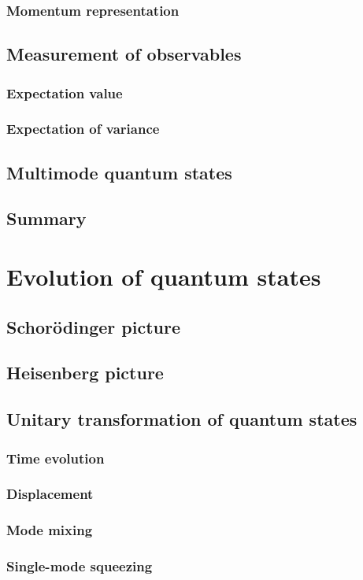 \documentclass{book}
\begin{document}
\subsection{Momentum representation}
\section{Measurement of observables}
\subsection{Expectation value}
\subsection{Expectation of variance}
\section{Multimode quantum states}
\section{Summary}

\chapter{Evolution of quantum states}
\section{Schor\"odinger picture}
\section{Heisenberg picture}
\section{Unitary transformation of quantum states}
\subsection{Time evolution}
\subsection{Displacement}
\subsection{Mode mixing}
\subsection{Single-mode squeezing}
\end{document}
